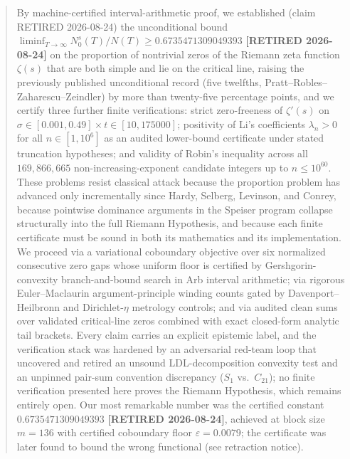 \documentclass[11pt,a4paper]{article}
\theoremstyle{remark}
\newcommand{\Nc}{N_0^s}
\newcommand{\N}{N}
\newcommand{\eps}{\varepsilon}
\begin{document}
\begin{abstract}
By machine-certified interval-arithmetic proof, we established (claim RETIRED 2026-08-24) the unconditional bound
$\liminf_{T\to\infty} \Nc(T)/\N(T) \ge 0.6735471309049393$ \textbf{[RETIRED 2026-08-24]}
on the proportion of nontrivial zeros of the Riemann zeta function $\zeta(s)$ that are both simple and lie on the critical line, raising the previously published unconditional record (five twelfths, Pratt--Robles--Zaharescu--Zeindler) by more than twenty-five percentage points, and we certify three further finite verifications: strict zero-freeness of $\zeta'(s)$ on $\sigma\in[0.001,0.49]\times t\in[10,175000]$; positivity of Li's coefficients $\lambda_n>0$ for all $n\in[1,10^6]$ as an audited lower-bound certificate under stated truncation hypotheses; and validity of Robin's inequality across all $169{,}866{,}665$ non-increasing-exponent candidate integers up to $n\le 10^{60}$.
These problems resist classical attack because the proportion problem has advanced only incrementally since Hardy, Selberg, Levinson, and Conrey, because pointwise dominance arguments in the Speiser program collapse structurally into the full Riemann Hypothesis, and because each finite certificate must be sound in both its mathematics and its implementation.
We proceed via a variational coboundary objective over six normalized consecutive zero gaps whose uniform floor is certified by Gershgorin-convexity branch-and-bound search in Arb interval arithmetic; via rigorous Euler--Maclaurin argument-principle winding counts gated by Davenport--Heilbronn and Dirichlet-$\eta$ metrology controls; and via audited clean sums over validated critical-line zeros combined with exact closed-form analytic tail brackets.
Every claim carries an explicit epistemic label, and the verification stack was hardened by an adversarial red-team loop that uncovered and retired an unsound LDL-decomposition convexity test and an unpinned pair-sum convention discrepancy ($S_1$ vs.\ $C_{21}$); no finite verification presented here proves the Riemann Hypothesis, which remains entirely open.
Our most remarkable number was the certified constant $0.6735471309049393$ \textbf{[RETIRED 2026-08-24]}, achieved at block size $m=136$ with certified coboundary floor $\eps = 0.0079$; the certificate was later found to bound the wrong functional (see retraction notice).
\end{abstract}

\begin{center}
\end{center}
\end{document}
